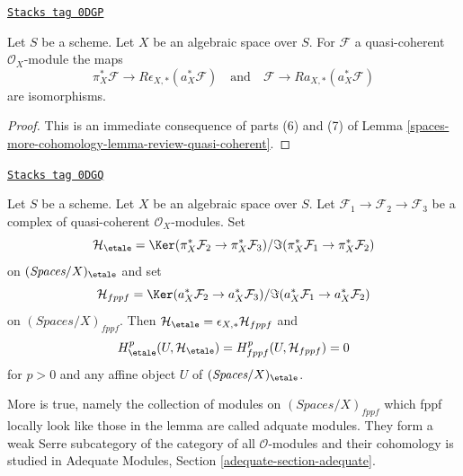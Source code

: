 \begin{lemma}
\label{spaces-more-cohomology-lemma-cohomological-descent-etale-fppf-modules}
\href{https://stacks.math.columbia.edu/tag/0DGP}{\texttt{Stacks tag 0DGP}}

Let $S$ be a scheme. Let $X$ be an algebraic space over $S$.
For $\mathcal{F}$ a quasi-coherent $\mathcal{O}_X$-module the maps
$$
\pi_X^*\mathcal{F} \longrightarrow R\epsilon_{X, *}(a_X^*\mathcal{F})
\quad\text{and}\quad
\mathcal{F} \longrightarrow Ra_{X, *}(a_X^*\mathcal{F})
$$
are isomorphisms.
\end{lemma}

\begin{proof}
This is an immediate consequence of parts (6) and (7) of
Lemma \ref{spaces-more-cohomology-lemma-review-quasi-coherent}.
\end{proof}

\begin{lemma}
\label{spaces-more-cohomology-lemma-vanishing-adequate}
\href{https://stacks.math.columbia.edu/tag/0DGQ}{\texttt{Stacks tag 0DGQ}}

Let $S$ be a scheme. Let $X$ be an algebraic space over $S$.
Let $\mathcal{F}_1 \to \mathcal{F}_2 \to \mathcal{F}_3$
be a complex of quasi-coherent $\mathcal{O}_X$-modules.
Set
$$
\mathcal{H}_\etale =
\Ker(\pi_X^*\mathcal{F}_2 \to \pi_X^*\mathcal{F}_3)/
\Im(\pi_X^*\mathcal{F}_1 \to \pi_X^*\mathcal{F}_2)
$$
on $(\textit{Spaces}/X)_\etale$ and set
$$
\mathcal{H}_{fppf} =
\Ker(a_X^*\mathcal{F}_2 \to a_X^*\mathcal{F}_3)/
\Im(a_X^*\mathcal{F}_1 \to a_X^*\mathcal{F}_2)
$$
on $(\textit{Spaces}/X)_{fppf}$.
Then $\mathcal{H}_\etale = \epsilon_{X, *}\mathcal{H}_{fppf}$
and
$$
H^p_\etale(U, \mathcal{H}_\etale) = H^p_{fppf}(U, \mathcal{H}_{fppf}) = 0
$$
for $p > 0$ and any affine object $U$ of $(\textit{Spaces}/X)_\etale$.
\end{lemma}

More is true, namely the collection of modules on
$(\textit{Spaces}/X)_{fppf}$ which fppf locally look like those
in the lemma are called adquate modules. They form a
weak Serre subcategory of the category of all $\mathcal{O}$-modules
and their cohomology is studied in
Adequate Modules, Section \ref{adequate-section-adequate}.

